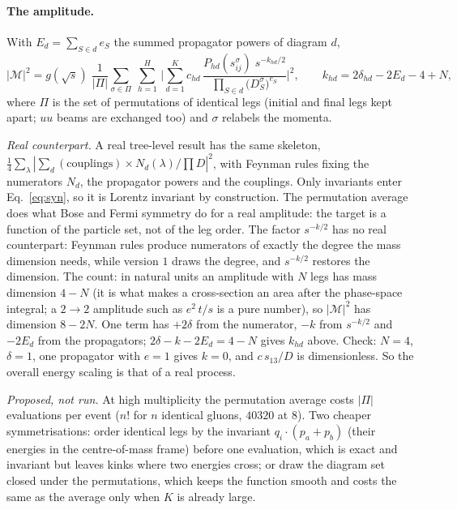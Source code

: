 \documentclass[11pt]{article}
\begin{document}
\paragraph{The amplitude.} With $E_d=\sum_{S\in d}e_S$ the summed propagator powers of diagram $d$,
\begin{equation}
  |\mathcal M|^2=g(\sqrt s)\;\frac1{|\Pi|}\sum_{\sigma\in\Pi}\ \sum_{h=1}^{H}\,
  \Big|\sum_{d=1}^{K}c_{hd}\,\frac{P_{hd}(s_{ij}^\sigma)\;s^{-k_{hd}/2}}{\prod_{S\in d}\big(D_S^\sigma\big)^{e_S}}\Big|^2,
  \qquad k_{hd}=2\delta_{hd}-2E_d-4+N,
  \label{eq:syn}
\end{equation}
where $\Pi$ is the set of permutations of identical legs (initial and final legs kept apart; $uu$ beams are exchanged too) and $\sigma$ relabels the momenta.
\par\smallskip\noindent \emph{Real counterpart.} A real tree-level result has the same skeleton,
$\tfrac14\sum_\lambda|\sum_d(\text{couplings})\times N_d(\lambda)/\prod D|^2$, with Feynman rules fixing the numerators
$N_d$, the propagator powers and the couplings. Only invariants enter Eq.~\eqref{eq:syn}, so it is Lorentz invariant by
construction. The permutation average does what Bose and Fermi symmetry do for a real amplitude: the target is a function
of the particle set, not of the leg order. The factor $s^{-k/2}$ has no real counterpart: Feynman rules produce
numerators of exactly the degree the mass dimension needs, while version $1$ draws the degree, and $s^{-k/2}$ restores
the dimension. The count: in natural units an amplitude with $N$ legs has mass dimension $4-N$ (it is what makes a
cross-section an area after the phase-space integral; a $2\to2$ amplitude such as $e^2\,t/s$ is a pure number), so
$|\mathcal M|^2$ has dimension $8-2N$. One term has $+2\delta$ from the numerator, $-k$ from $s^{-k/2}$ and $-2E_d$ from
the propagators; $2\delta-k-2E_d=4-N$ gives $k_{hd}$ above. Check: $N=4$, $\delta=1$, one propagator with $e=1$ gives
$k=0$, and $c\,s_{13}/D$ is dimensionless. So the overall energy scaling is that of a real process.
\par\smallskip\noindent \emph{Proposed, not run.} At high multiplicity the permutation average costs $|\Pi|$ evaluations per event ($n!$ for
$n$ identical gluons, $40320$ at $8$). Two cheaper symmetrisations: order identical legs by the invariant
$q_i\!\cdot\!(p_a+p_b)$ (their energies in the centre-of-mass frame) before one evaluation, which is exact and invariant
but leaves kinks where two energies cross; or draw the diagram set closed under the permutations, which keeps the
function smooth and costs the same as the average only when $K$ is already large.
\end{document}
